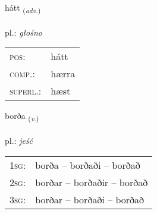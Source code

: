 \documentclass[frontgrid, backgrid]{flacards}\usepackage[]{graphicx}\usepackage[]{xcolor}
\begin{document}
\renewcommand{\flhead}{\vskip5pt \fboxsep=0pt {\small\bfseries\footnotesize Atviksorð | przysłówek}}
\renewcommand{\fcfoot}{\vskip5pt \fboxsep=0pt \hspace{2pt}{\small\bfseries\footnotesize 1K}}

\renewcommand{\blhead}{\vskip5pt {\small\bfseries\footnotesize Atviksorð | przysłówek }}
\renewcommand{\bcfoot}{\vskip5pt \hspace{2pt}{\small\bfseries\footnotesize 1K}}


{hátt \small{\textsubscript{(\textit{adv.})}} \\[1ex] %
\textphonetic{[hauht]} \\
pl.: \emph{głośno} \\  [2ex]
\renewcommand*{\arraystretch}{0.8}
\begin{tabular}{ll}
\textsc{pos}: & hátt \\ 
\textsc{comp.}: & hærra \\ 
\textsc{superl.}: & hæst \\
\end{tabular}
}

\renewcommand{\flhead}{\vskip5pt \fboxsep=0pt {\small\bfseries\footnotesize Sagnorð | czasownik}}
\renewcommand{\fcfoot}{\vskip5pt \fboxsep=0pt \hspace{2pt}{\small\bfseries\footnotesize 1K}}

\renewcommand{\blhead}{\vskip5pt {\small\bfseries\footnotesize Sagnorð | czasownik }}
\renewcommand{\bcfoot}{\vskip5pt \hspace{2pt}{\small\bfseries\footnotesize 1K}}


{borða \small{\textsubscript{(\textit{v.})}} \\[1ex] %
\textphonetic{[pɔrða]} \\
pl.: \emph{jeść} \\  [2ex]
\renewcommand*{\arraystretch}{0.8}
\begin{tabular}{p{1cm}l}
\textsc{1sg}: & borða -- borðaði -- borðað \\ 
\textsc{2sg}: & borðar -- borðaðir -- borðað \\ 
\textsc{3sg}: & borðar -- borðaði -- borðað \\ 
\end{tabular}
}
\end{document}
